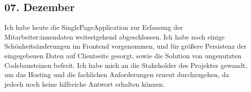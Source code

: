 \subsection{07. Dezember}
Ich habe heute die SinglePageApplication zur Erfassung der Mitarbeiter:innendaten weitestgehend abgeschlossen. Ich habe noch einige Schönheitsänderungen im Frontend vorgenommen, und für größere Persistenz der eingegebenen Daten auf Clientseite gesorgt, sowie die Solution von ungenutzten Codebausteinen befreit. Ich habe mich an die Stakeholder des Projektes gewandt, um das Hosting und die fachlichen Anforderungen erneut durchzugehen, da jedoch noch keine hilfreiche Antwort erhalten können.